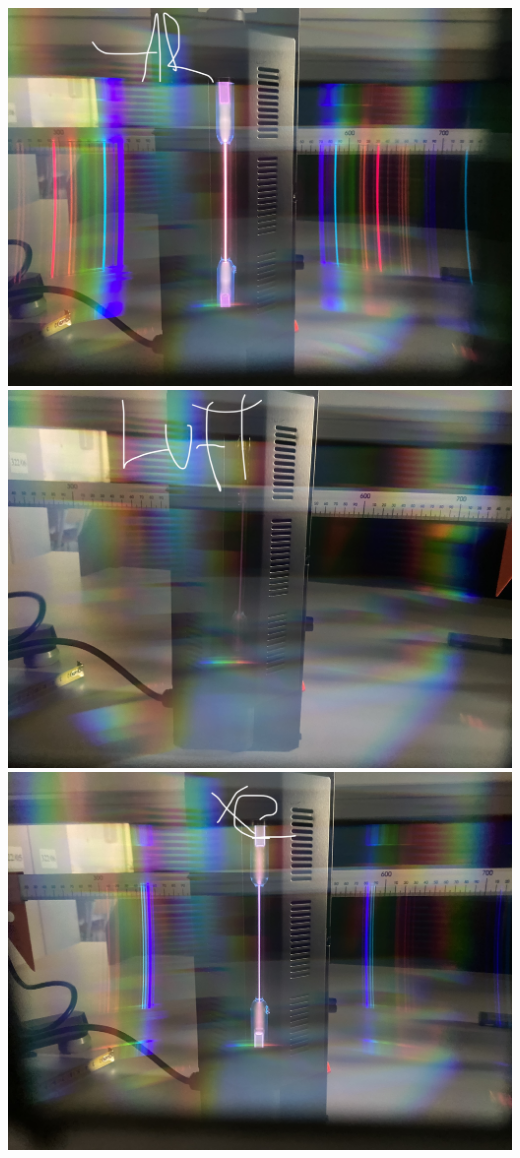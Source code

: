 \documentclass[12pt,oneside,oldfontcommands]{memoir}
\begin{document}
\includegraphics[width=.96\columnwidth]{figures/IMG_5300.jpg}
\includegraphics[width=.96\columnwidth]{figures/IMG_5301.jpg}
\includegraphics[width=.96\columnwidth]{figures/IMG_5302.jpg}
\end{document}
